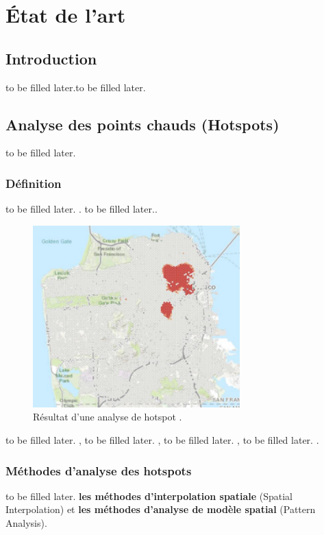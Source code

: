 \chapter{État de l'art}

\clearpage


\section{Introduction}to be filled later.to be filled later.


\section{Analyse des points chauds (Hotspots)}
\label{sec:hotspot}to be filled later.

\medskip

\subsection{Définition}to be filled later. \parencite{mennis_spatial_2009}. to be filled later.\parencite{shekhar_identifying_2011}.

\medskip

\begin{figure}[hbt!]
  \centering
  \includegraphics[width=8cm]{images_pfe/hotspot.png}
  \caption{Résultat d'une analyse de hotspot \parencite{kalinic_kernel_2018}.}
  \label{fig:vue-snoc-pos}
\end{figure}
\FloatBarrier
to be filled later. \parencite{hart_kernel_2014,ansari_methods_2014,kalinic_kernel_2018}, to be filled later. \parencite{anderson_kernel_2009,montella_comparative_2010,yu_comparative_2014}, to be filled later. \parencite{lin_hotspot_2010}, to be filled later. \parencite{bagstad_evaluating_2017}.

\subsection{Méthodes d'analyse des hotspots}
to be filled later. \textbf{les méthodes d'interpolation spatiale} (Spatial Interpolation) et \textbf{les méthodes d'analyse de modèle spatial} (Pattern Analysis).

